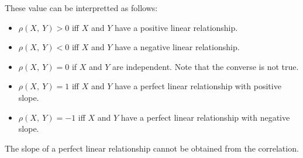 \documentclass{article}
\begin{document}
\begin{multicols}{3}
    These value can be interpretted as follows:
    \begin{itemize}
        \item \(\rho\left( X,\: Y \right) > 0\) iff \(X\) and \(Y\) have a positive linear relationship.
        \item \(\rho\left( X,\: Y \right) < 0\) iff \(X\) and \(Y\) have a negative linear relationship.
        \item \(\rho\left( X,\: Y \right) = 0\) if \(X\) and \(Y\) are independent. Note that the converse is not true.
        \item \(\rho\left( X,\: Y \right) = 1\) iff \(X\) and \(Y\) have a perfect linear relationship with positive slope.
        \item \(\rho\left( X,\: Y \right) = -1\) iff \(X\) and \(Y\) have a perfect linear relationship with negative slope.
    \end{itemize}
    The slope of a perfect linear relationship cannot be obtained from the correlation.
\end{multicols}
\end{document}
